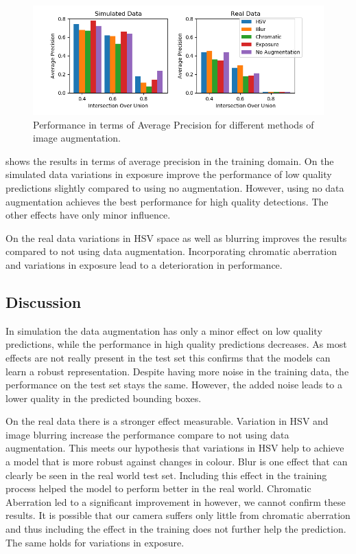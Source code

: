\begin{figure}[htbp]
	\centering
	\includegraphics[width=\textwidth]{fig/pp_bar}
	\caption{Performance in terms of Average Precision for different methods  of image augmentation.}
	\label{fig:pp_bar}
\end{figure}

 shows the results in terms of average precision in the training domain. On the simulated data variations in exposure improve the performance of low quality predictions slightly compared to using no augmentation. However, using no data augmentation achieves the best performance for high quality detections. The other effects have only minor influence. 

On the real data variations in HSV space as well as blurring improves the results compared to not using data augmentation. Incorporating chromatic aberration and variations in exposure lead to a deterioration in performance.

\subsection{Discussion}

In simulation the data augmentation has only a minor effect on low quality predictions, while the performance in high quality predictions decreases. As most effects are not really present in the test set this confirms that the models can learn a robust representation. Despite having more noise in the training data, the performance on the test set stays the same. However, the added noise leads to a lower quality in the predicted bounding boxes.

On the real data there is a stronger effect measurable. Variation in HSV and image blurring increase the performance compare to not using data augmentation. This meets our hypothesis that variations in HSV help to achieve a model that is more robust against changes in colour. Blur is one effect that can clearly be seen in the real world test set. Including this effect in the training process helped the model to perform better in the real world. Chromatic Aberration led to a significant improvement in \cite{Carlson2018} however, we cannot confirm these results. It is possible that our camera suffers only little from  chromatic aberration and thus including the effect in the training does not further help the prediction. The same holds for variations in exposure. 

